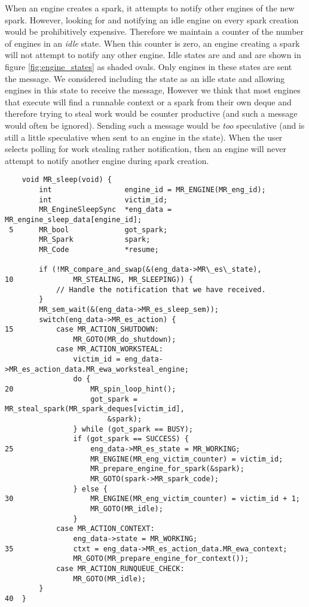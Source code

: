 When an engine creates a spark,
it attempts to notify other engines of the new spark.
However, looking for and notifying an idle engine on every spark creation
would be prohibitively expensive.
Therefore we maintain a counter of the number of engines in an \emph{idle}
state.
When this counter is zero, an engine creating a spark will not attempt to
notify any other engine.
Idle states are  and 
and are shown in figure \ref{fig:engine_states} as shaded ovals.
Only engines in these states are sent the  message.
We considered including the  state as an idle
state and allowing engines in this state to receive the
 message,
However we think that most engines that execute \idle will find a runnable
context or a spark from their own deque and therefore trying to steal work
would be counter productive (and such a message would often be ignored).
Sending such a message would be \emph{too} speculative
(and is still a little speculative when sent to an engine in the
 state).
When the user selects polling for work stealing rather notification,
then an engine will never attempt to notify another engine during spark
creation.

\begin{algorithm}[tbp]
\begin{verbatim}
    void MR_sleep(void) {
        int                 engine_id = MR_ENGINE(MR_eng_id);
        int                 victim_id;
        MR_EngineSleepSync  *eng_data = MR_engine_sleep_data[engine_id];
 5      MR_bool             got_spark;
        MR_Spark            spark;
        MR_Code             *resume;

        if (!MR_compare_and_swap(&(eng_data->MR\_es\_state),
10              MR_STEALING, MR_SLEEPING)) {
            // Handle the notification that we have received.
        }
        MR_sem_wait(&(eng_data->MR_es_sleep_sem));
        switch(eng_data->MR_es_action) {
15          case MR_ACTION_SHUTDOWN:
                MR_GOTO(MR_do_shutdown);
            case MR_ACTION_WORKSTEAL:
                victim_id = eng_data->MR_es_action_data.MR_ewa_worksteal_engine;
                do {
20                  MR_spin_loop_hint();
                    got_spark = MR_steal_spark(MR_spark_deques[victim_id],
                        &spark);
                } while (got_spark == BUSY);
                if (got_spark == SUCCESS) {
25                  eng_data->MR_es_state = MR_WORKING;
                    MR_ENGINE(MR_eng_victim_counter) = victim_id;
                    MR_prepare_engine_for_spark(&spark);
                    MR_GOTO(spark->MR_spark_code);
                } else {
30                  MR_ENGINE(MR_eng_victim_counter) = victim_id + 1;
                    MR_GOTO(MR_idle);
                }
            case MR_ACTION_CONTEXT:
                eng_data->state = MR_WORKING;
35              ctxt = eng_data->MR_es_action_data.MR_ewa_context;
                MR_GOTO(MR_prepare_engine_for_context());
            case MR_ACTION_RUNQUEUE_CHECK:
                MR_GOTO(MR_idle);
        }
40  }
\end{verbatim}
\caption{\sleep}
\label{alg:sleep}
\end{algorithm}

